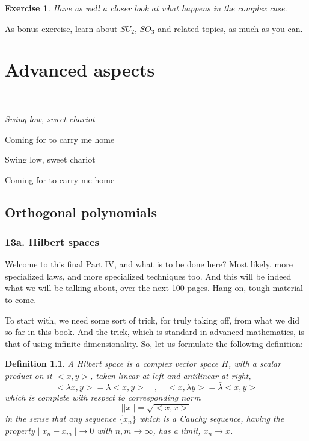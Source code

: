 \documentclass[12pt]{amsbook}
\newtheorem{definition}[theorem]{Definition}
\newtheorem{exercise}[theorem]{Exercise}
\begin{document}
\begin{exercise}
Have as well a closer look at what happens in the complex case.
\end{exercise}

As bonus exercise, learn about $SU_2$, $SO_3$ and related topics, as much as you can.

\part{Advanced aspects}

\ \vskip50mm

\begin{center}
{\em Swing low, sweet chariot

Coming for to carry me home

Swing low, sweet chariot

Coming for to carry me home}
\end{center}

\chapter{Orthogonal polynomials}

\section*{13a. Hilbert spaces}

Welcome to this final Part IV, and what is to be done here? Most likely, more specialized laws, and more specialized techniques too. And this will be indeed what we will be talking about, over the next 100 pages. Hang on, tough material to come.

\bigskip

To start with, we need some sort of trick, for truly taking off, from what we did so far in this book. And the trick, which is standard in advanced mathematics, is that of using infinite dimensionality. So, let us formulate the following definition:


\begin{definition}
A Hilbert space is a complex vector space $H$, with a scalar product on it $<x,y>$, taken linear at left and antilinear at right,
$$<\lambda x,y>=\lambda<x,y>\quad,\quad <x,\lambda y>=\bar{\lambda}<x,y>$$
which is complete with respect to corresponding norm
$$||x||=\sqrt{<x,x>}$$
in the sense that any sequence $\{x_n\}$ which is a Cauchy sequence, having the property $||x_n-x_m||\to0$ with $n,m\to\infty$, has a limit, $x_n\to x$.
\end{definition}
\end{document}
